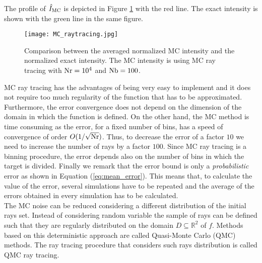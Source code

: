 The profile of $\hat{I}_{\textrm{MC}}$ is depicted in Figure \ref{fig:mc_intensity} with the red line. The exact intensity is shown with the green line in the same figure.
\begin{figure}[t]
\begin{center}
    \texttt{[image: MC\_raytracing.jpg]}
    \caption{Comparison between the averaged normalized MC intensity and the normalized exact intensity. The MC intensity is using MC ray tracing with $\textrm{Nr} = 10^4$ and $\textrm{Nb} = 100$.}
   \label{fig:mc_intensity}
\end{center}
\end{figure}
MC ray tracing has the advantages of being very easy to implement and it does not require too much regularity of the function that has to be approximated. Furthermore, the error convergence does not depend on the dimension of the domain in which the function is defined.
On the other hand, the MC method is time consuming as the error, for a fixed number of bins, has a speed of convergence of order $O(1/\sqrt{\textrm{Nr}})$. 
Thus, to decrease the error of a factor $10$ we need to increase the number of rays by a factor $100$.
Since MC ray tracing is a binning procedure, the error depends also on the number of bins in which the target is divided. Finally we remark that the error bound is only a \emph{probabilistic} error as shown in Equation (\ref{eq:mean_error}). This means that, to calculate the value of the error, several simulations have to be repeated and the average of the errors obtained in every simulation has to be calculated. \\ \indent 
The MC noise can be reduced considering a different distribution of the initial rays set.
Instead of considering random variable the sample of rays can be defined such that they are regularly distributed on the domain $D\subseteq\mathbb{R}^2$ of $f$. Methods based on this deterministic approach are called Quasi-Monte Carlo (QMC) methods. The ray tracing procedure that considers such rays distribution is called QMC ray tracing.
